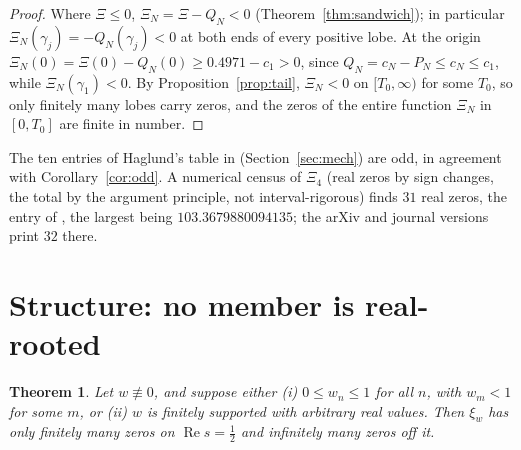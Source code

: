 \documentclass[11pt]{article}
\theoremstyle{plain}
\newtheorem{theorem}{Theorem}[section]
\theoremstyle{definition}
\theoremstyle{remark}
\newcommand{\re}{\operatorname{Re}}
\begin{document}
\begin{proof}
Where $\Xi \le 0$, $\Xi_N = \Xi - Q_N < 0$ (Theorem~\ref{thm:sandwich}); in
particular $\Xi_N(\gamma_j) = -Q_N(\gamma_j) < 0$ at both ends of every positive
lobe. At the origin $\Xi_N(0) = \Xi(0) - Q_N(0) \ge 0.4971 - c_1 > 0$, since
$Q_N = c_N - P_N \le c_N \le c_1$, while $\Xi_N(\gamma_1) < 0$. By
Proposition~\ref{prop:tail}, $\Xi_N < 0$ on $[T_0, \infty)$ for some $T_0$, so
only finitely many lobes carry zeros, and the zeros of the entire function
$\Xi_N$ in $[0, T_0]$ are finite in number.
\end{proof}

The ten entries of Haglund's table in \cite[p.~4]{HagW}
(Section~\ref{sec:mech}) are odd, in agreement with Corollary~\ref{cor:odd}. A
numerical census of $\Xi_4$ (real zeros by sign changes, the total by the
argument principle, not interval-rigorous) finds $31$ real zeros, the entry of
\cite{HagW}, the largest being $103.3679880094135$; the arXiv and journal
versions print $32$ there.

\section{Structure: no member is real-rooted}
\label{sec:structure}

\begin{theorem}\label{thm:A}
Let $w \not\equiv 0$, and suppose either \textup{(i)} $0 \le w_n \le 1$ for all
$n$, with $w_m < 1$ for some $m$, or \textup{(ii)} $w$ is finitely supported with
arbitrary real values. Then $\xi_w$ has only finitely many zeros on
$\re s = \tfrac12$ and infinitely many zeros off it.
\end{theorem}
\end{document}
